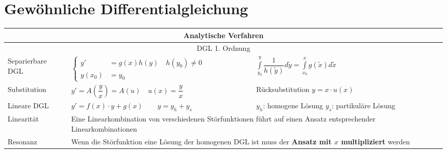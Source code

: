 \section{Gewöhnliche Differentialgleichung}
\renewcommand{\arraystretch}{2.5}
\begin{tabularx}{\columnwidth}{p{2.8cm}XX}
	 \hline 
	\multicolumn{3}{c}{\textbf{Analytische Verfahren}}\\
	
	\hline 
	\multicolumn{3}{c}{DGL 1. Ordnung}\\
	\hdashline
	Separierbare DGL & 
	$\begin{cases} y' &=g(x)h(y) \quad  h(y_0)\neq 0\\ y(x_0) &= y_0  \end{cases}$ & 
	$\int\limits_{y_0}^y \dfrac{1}{h(\tilde y)}d\tilde y = \int\limits_{x_0}^x g(\tilde x)d\tilde x$\\
 
	\hdashline
	Substitution  & $y' = A\left(\dfrac{y}{x}\right) = A(u) \quad u(x) = \dfrac{y}{x}$ & Rücksubstitution $y = x\cdot u(x)$\\
	\hdashline
	Lineare DGL & $y' = f(x)\cdot y + g(x) \qquad  y = y_h + y_s$ & $y_h$: homogene Lösung \newline $y_s$: partikuläre Lösung\\
	
	Linearität & \multicolumn{2}{p{13cm}}{Eine Linearkombination von verschiedenen Störfunktionen führt auf einen Ansatz entsprechender Linearkombinationen}\\
	Resonanz & \multicolumn{2}{p{13cm}}{Wenn die Störfunktion eine Lösung der homogenen DGL ist muss der \textbf{Ansatz mit $x$ multipliziert} werden}\\
	

\end{tabularx}
